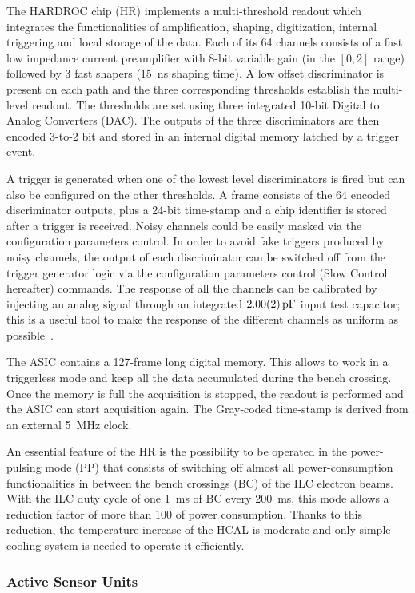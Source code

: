The HARDROC chip (HR) implements a multi-threshold readout which integrates the
functionalities of amplification, shaping, digitization, internal triggering and
local storage of the data. Each of its 64 channels consists of a fast low
impedance current preamplifier with 8-bit variable gain (in the $[0,2]$ range)
followed by 3 fast shapers (\SI{15}{ns} shaping time). A low offset discriminator is
present on each path and the three corresponding thresholds establish the
multi-level readout. The thresholds are set using three integrated 10-bit
Digital to Analog Converters (DAC). The outputs of the three discriminators are
then encoded 3-to-2 bit and stored in an internal digital memory latched by a
trigger event.

A trigger is generated when one of the lowest level discriminators is fired but
can also be configured on the other thresholds. A frame consists of the 64
encoded discriminator outputs, plus a 24-bit time-stamp and a chip identifier is
stored after a trigger is received. Noisy channels could be easily masked via
the configuration parameters control. In order to avoid fake triggers produced
by noisy channels, the output of each discriminator can be switched off from the
trigger generator logic via the configuration parameters control (Slow Control
hereafter) commands. The response of all the channels can be calibrated by
injecting an analog signal through an integrated $\SI{2+-0.02}{pF}$ input test
capacitor; this is a useful tool to make the response of the different channels
as uniform as possible~\cite{1748-0221-6-02-P02001}.

The ASIC contains a 127-frame long digital memory. This allows to work in a
triggerless mode and keep all the data accumulated during the bench crossing.
Once the memory is full the acquisition is stopped, the readout is performed
and the ASIC can start acquisition again. The Gray-coded time-stamp is derived
from an external \SI{5}{MHz} clock.

An essential feature of the HR is the possibility to be operated in the
power-pulsing mode (PP) that consists of switching off almost all
power-consumption functionalities in between the bench crossings (BC) of the ILC
electron beams. With the ILC duty cycle of one \SI{1}{ms} of BC every \SI{200}{ms}, this
mode allows a reduction factor of more than 100 of power consumption. Thanks to
this reduction, the temperature increase of the HCAL is moderate and only
simple cooling system is needed to operate it efficiently.

\subsubsection{Active Sensor Units}

